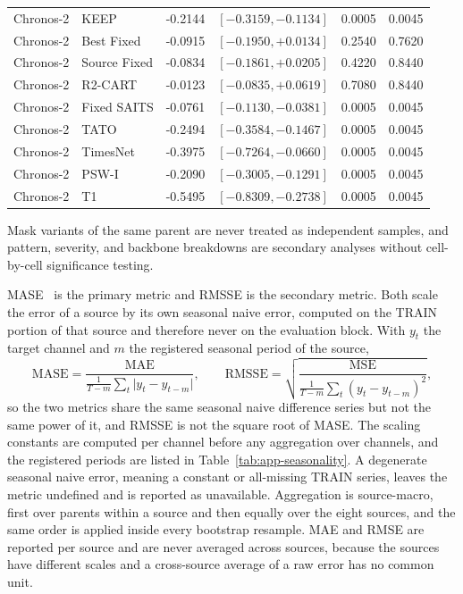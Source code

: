 \documentclass{article}
\begin{document}
\begin{table}[!t]
\begin{tabular*}{\textwidth}{@{\extracolsep{\fill}}llrrrr@{}}
Chronos-2 & KEEP & -0.2144 & $[-0.3159,-0.1134]$ & 0.0005 & 0.0045 \\
Chronos-2 & Best Fixed & -0.0915 & $[-0.1950,+0.0134]$ & 0.2540 & 0.7620 \\
Chronos-2 & Source Fixed & -0.0834 & $[-0.1861,+0.0205]$ & 0.4220 & 0.8440 \\
Chronos-2 & R2-CART & -0.0123 & $[-0.0835,+0.0619]$ & 0.7080 & 0.8440 \\
Chronos-2 & Fixed SAITS & -0.0761 & $[-0.1130,-0.0381]$ & 0.0005 & 0.0045 \\
Chronos-2 & TATO & -0.2494 & $[-0.3584,-0.1467]$ & 0.0005 & 0.0045 \\
Chronos-2 & TimesNet & -0.3975 & $[-0.7264,-0.0660]$ & 0.0005 & 0.0045 \\
Chronos-2 & PSW-I & -0.2090 & $[-0.3005,-0.1291]$ & 0.0005 & 0.0045 \\
Chronos-2 & T1 & -0.5495 & $[-0.8309,-0.2738]$ & 0.0005 & 0.0045 \\
\bottomrule
  \end{tabular*}
\end{table}

Mask variants of the same parent are never
treated as independent samples, and pattern, severity, and backbone breakdowns are secondary
analyses without cell-by-cell significance testing.

MASE~\citep{hyndman2006mase} is the primary metric and RMSSE is the secondary metric. Both
scale the error of a source by its own seasonal naive error, computed on the TRAIN portion of
that source and therefore never on the evaluation block. With $y_t$ the target channel and $m$
the registered seasonal period of the source,
\begin{equation}
  \mathrm{MASE} = \frac{\mathrm{MAE}}{\frac{1}{T-m}\sum_{t} \lvert y_t - y_{t-m} \rvert},
  \qquad
  \mathrm{RMSSE} = \sqrt{\frac{\mathrm{MSE}}{\frac{1}{T-m}\sum_{t} (y_t - y_{t-m})^2}},
  \label{eq:metrics}
\end{equation}
so the two metrics share the same seasonal naive difference series but not the same power of
it, and RMSSE is not the square root of MASE. The scaling constants are computed per channel
before any aggregation over channels, and the registered periods are listed in
Table~\ref{tab:app-seasonality}. A degenerate seasonal naive error, meaning a constant or
all-missing TRAIN series, leaves the metric undefined and is reported as unavailable. Aggregation is source-macro, first over parents within a source and then equally over
the eight sources, and the same order is applied inside every bootstrap resample. MAE and RMSE
are reported per source and are never averaged across sources, because the sources have
different scales and a cross-source average of a raw error has no common unit.
\end{document}
